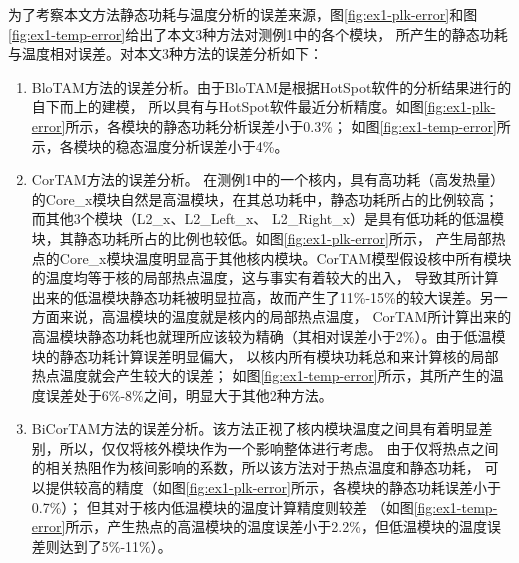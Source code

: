 为了考察本文方法静态功耗与温度分析的误差来源，图\ref{fig:ex1-plk-error}和图\ref{fig:ex1-temp-error}给出了本文3种方法对测例1中的各个模块， 所产生的静态功耗与温度相对误差。对本文3种方法的误差分析如下：
\begin{enumerate}[1)]
\item BloTAM方法的误差分析。由于BloTAM是根据HotSpot软件的分析结果进行的自下而上的建模， 所以具有与HotSpot软件最近分析精度。如图\ref{fig:ex1-plk-error}所示，各模块的静态功耗分析误差小于0.3\%； 如图\ref{fig:ex1-temp-error}所示，各模块的稳态温度分析误差小于4\%。
\item CorTAM方法的误差分析。 在测例1中的一个核内，具有高功耗（高发热量）的Core\_x模块自然是高温模块，在其总功耗中，静态功耗所占的比例较高； 而其他3个模块（L2\_x、L2\_Left\_x、 L2\_Right\_x）是具有低功耗的低温模块，其静态功耗所占的比例也较低。如图\ref{fig:ex1-plk-error}所示， 产生局部热点的Core\_x模块温度明显高于其他核内模块。CorTAM模型假设核中所有模块的温度均等于核的局部热点温度，这与事实有着较大的出入， 导致其所计算出来的低温模块静态功耗被明显拉高，故而产生了11\%-15\%的较大误差。另一方面来说，高温模块的温度就是核内的局部热点温度， CorTAM所计算出来的高温模块静态功耗也就理所应该较为精确（其相对误差小于2\%）。由于低温模块的静态功耗计算误差明显偏大， 以核内所有模块功耗总和来计算核的局部热点温度就会产生较大的误差； 如图\ref{fig:ex1-temp-error}所示，其所产生的温度误差处于6\%-8\%之间，明显大于其他2种方法。

\item BiCorTAM方法的误差分析。该方法正视了核内模块温度之间具有着明显差别，所以，仅仅将核外模块作为一个影响整体进行考虑。 由于仅将热点之间的相关热阻作为核间影响的系数，所以该方法对于热点温度和静态功耗， 可以提供较高的精度（如图\ref{fig:ex1-plk-error}所示，各模块的静态功耗误差小于0.7\%）； 但其对于核内低温模块的温度计算精度则较差 （如图\ref{fig:ex1-temp-error}所示，产生热点的高温模块的温度误差小于2.2\%，但低温模块的温度误差则达到了5\%-11\%）。
\end{enumerate}

